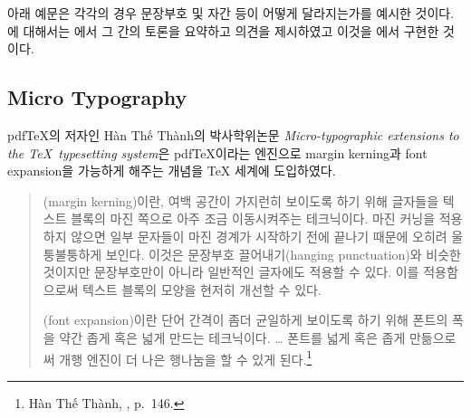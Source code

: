 아래 예문은 각각의 경우 문장부호 및 자간 등이 어떻게 달라지는가를
예시한 것이다. 에 대해서는 \cite{karnes2007}에서
그 간의 토론을 요약하고 의견을 제시하였고 이것을 \kotex 에서
구현한 것이다.

\medskip

\noindent{}

\medskip

\subsection{Micro Typography}\label{sec:microtype}

pdf\TeX 의 저자인 H\`an Th\'{\^e} Th\`anh의 박사학위논문
\emph{Micro-typographic extensions to the \TeX\ typesetting system}\cite{Thanh:2000}은
pdf\TeX 이라는 엔진으로 margin kerning과 font expansion을
가능하게 해주는  개념을 \TeX{} 세계에
도입하였다. 
\begin{quotation}
(margin kerning)이란, 여백 공간이 가지런히 보이도록
하기 위해 글자들을 텍스트 블록의 마진 쪽으로 아주 조금 이동시켜주는
테크닉이다. 마진 커닝을 적용하지 않으면 일부 문자들이 마진 경계가
시작하기 전에 끝나기 때문에 오히려 울퉁불퉁하게 보인다. 이것은
문장부호 끌어내기(hanging punctuation)와 비슷한 것이지만
문장부호만이 아니라 일반적인 글자에도 적용할 수 있다. 이를 적용함으로써
텍스트 블록의 모양을 현저히 개선할 수 있다.

(font expansion)이란 단어 간격이 좀더 균일하게
보이도록 하기 위해 폰트의 폭을 약간 좁게 혹은 넓게 만드는 테크닉이다.
{\ldots} 폰트를 넓게 혹은 좁게 만듦으로써 개행 엔진이
더 나은 행나눔을 할 수 있게 된다.\footnote{%
  H\`an Th\'{\^e} Th\`anh, \cite{Thanh:2001}, p.~146.}
\end{quotation}

